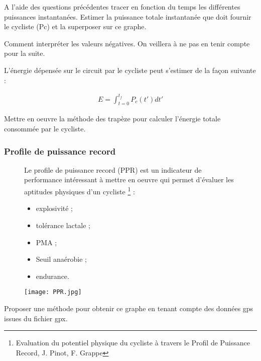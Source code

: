 \question{} A l'aide des questions précédentes tracer en fonction du temps les différentes puissances instantanées. Estimer la puissance totale instantanée que doit fournir le cycliste (Pc) et la superposer sur ce graphe.

\question{} Comment interpréter les valeurs négatives. On veillera à ne pas en tenir compte pour la suite.

L'énergie dépensée sur le circuit par le cycliste peut s'estimer de la façon suivante : 

\begin{align*}
E=\displaystyle{\int_{t=0}^{t_f}P_c(t')dt'}
\end{align*}

\question{} Mettre en oeuvre la méthode des trapèze pour calculer l'énergie totale consommée par le cycliste.


\subsubsection{Profile de puissance record}



\begin{figure}[!htb]
\begin{minipage}{0.5\textwidth}
Le profile de puissance record (PPR) est un indicateur de performance intéressant à mettre en oeuvre qui permet d'évaluer les aptitudes physiques d'un cycliste \footnote{Evaluation du potentiel physique du cycliste à travers le Profil de Puissance Record, J. Pinot, F. Grappe}  : 
\begin{itemize}
\item explosivité ;
\item tolérance lactale ;
\item PMA ;
\item Seuil anaérobie ;
\item endurance.
\end{itemize}
\end{minipage}
\begin{minipage}{0.5\textwidth}
\begin{center}
\texttt{[image: PPR.jpg]}
\caption{\label{PPR}}
\end{center}
\end{minipage}
\end{figure}

\question{} Proposer une méthode pour obtenir ce graphe en tenant compte des données gps issues du fichier gpx.

